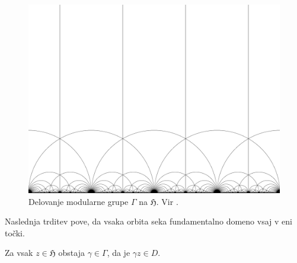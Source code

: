 \documentclass[mat1]{fmfdelo}
\numberwithin{equation}{section}
\newcommand{\HH}{\mathfrak{H}}
\newcommand{\SL}{\Gamma}
\theoremstyle{definition}
\begin{document}
\begin{figure}
    \centering
    \includegraphics[scale=0.12]{ModularTiling_3.png}
    \caption{Delovanje modularne grupe $\SL$ na $\HH$. Vir \cite{Cheritat}.}
    \label{slika delovanja modularne grupe}
\end{figure}

Naslednja trditev pove, da vsaka orbita seka fundamentalno domeno vsaj v eni točki.

\begin{trditev}
    \label{predstavnik fundamentalne domene}
    Za vsak $z \in \HH$ obstaja $\gamma \in \SL$, da je $\gamma z \in D$.
\end{trditev}
\end{document}
